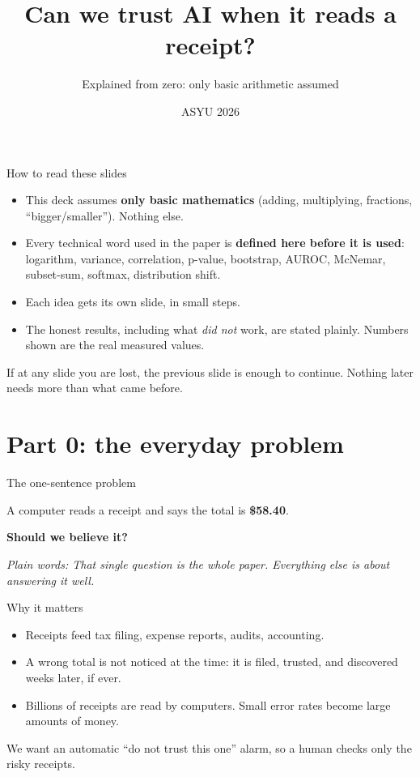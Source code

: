 \documentclass[aspectratio=169]{beamer}
\title{Can we trust AI when it reads a receipt?}
\subtitle{Explained from zero: only basic arithmetic assumed}
\author{ASYU 2026}
\date{}
\newcommand{\bigq}[1]{\begin{center}{\Large #1}\end{center}}
\newcommand{\keybox}[1]{\begin{center}\colorbox{grey!15}{\parbox{0.92\linewidth}{\centering #1}}\end{center}}
\newcommand{\plain}[1]{\textit{\textcolor{sig}{Plain words:} #1}}
\begin{document}
\frame{\titlepage}

\begin{frame}{How to read these slides}
\begin{itemize}
\item This deck assumes \textbf{only basic mathematics} (adding,
multiplying, fractions, ``bigger/smaller''). Nothing else.
\item Every technical word used in the paper is \textbf{defined here
before it is used}: logarithm, variance, correlation, p-value,
bootstrap, AUROC, McNemar, subset-sum, softmax, distribution shift.
\item Each idea gets its own slide, in small steps.
\item The honest results, including what \emph{did not} work, are
stated plainly. Numbers shown are the real measured values.
\end{itemize}
\vspace{1em}
\keybox{If at any slide you are lost, the previous slide is enough to
continue. Nothing later needs more than what came before.}
\end{frame}

\section{Part 0: the everyday problem}
\begin{frame}{The one-sentence problem}
\bigq{A computer reads a receipt and says the total is \textbf{\$58.40}.}
\vspace{1em}
\bigq{\textbf{Should we believe it?}}
\vspace{1em}
\plain{That single question is the whole paper. Everything else is
about answering it well.}
\end{frame}

\begin{frame}{Why it matters}
\begin{itemize}
\item Receipts feed tax filing, expense reports, audits, accounting.
\item A wrong total is not noticed at the time: it is filed,
trusted, and discovered weeks later, if ever.
\item Billions of receipts are read by computers. Small error rates
become large amounts of money.
\end{itemize}
\vspace{1em}
\keybox{We want an automatic ``\textcolor{bad}{do not trust this
one}'' alarm, so a human checks only the risky receipts.}
\end{frame}
\end{document}
